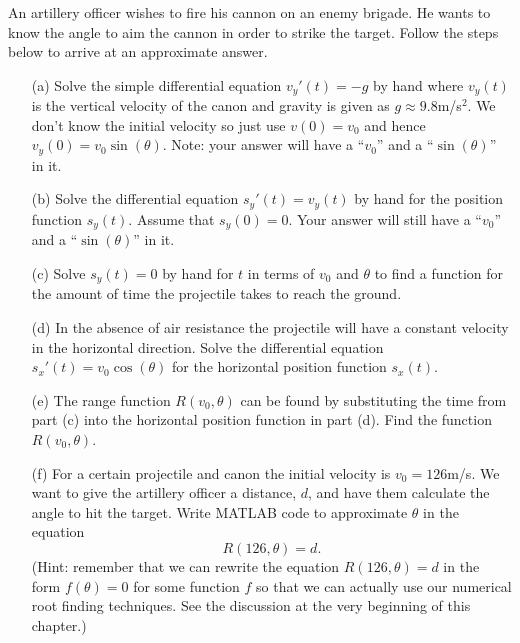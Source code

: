 \begin{problem}
    An artillery officer wishes to fire his cannon on an enemy brigade.  He wants to know
    the angle to aim the cannon in order to strike the target.  Follow the steps below to
    arrive at an approximate answer.
    \begin{enumerate}
        \item[(a)] Solve the simple differential equation $v_y'(t) = -g$ by hand where $v_y(t)$
            is the vertical velocity of the canon and gravity is given as $g \approx
            9.8$m/s$^2$.  We don't know the initial velocity so just use $v(0) = v_0$ and
            hence $v_y(0) = v_0 \sin(\theta)$. Note: your answer will have a ``$v_0$'' and a
            ``$\sin(\theta)$'' in it.
        \item[(b)] Solve the differential equation $s_y'(t) = v_y(t)$ by hand for the position
            function $s_y(t)$.  Assume that $s_y(0) = 0$.  Your answer will still have a ``$v_0$'' and a
            ``$\sin(\theta)$'' in it.
        \item[(c)] Solve $s_y(t) = 0$ by hand for $t$ in terms of $v_0$ and $\theta$ to
            find a function for the amount of time the projectile takes to reach the
            ground.
        \item[(d)] In the absence of air resistance the projectile will have a constant
            velocity in the horizontal direction.  Solve the differential equation
            $s_x'(t) = v_0 \cos(\theta)$ for the horizontal position function $s_x(t)$.  
        \item[(e)] The range function $R(v_0,\theta)$ can be found by substituting the
            time from part (c) into the horizontal position function in part (d).  Find
            the function $R(v_0,\theta)$.
        \item[(f)] For a certain projectile and canon the initial velocity is $v_0 =
            126$m/s.  We want to give the artillery officer a distance, $d$, and have them
            calculate the angle to hit the target.  Write MATLAB code to approximate
            $\theta$ in the equation 
            \[ R(126,\theta) = d. \]
            (Hint: remember that we can rewrite the equation $R(126,\theta)=d$ in the form
            $f(\theta) = 0$ for some function $f$ so that we can actually use our
            numerical root finding techniques. See the discussion at the very beginning of
            this chapter.)


\end{enumerate}
\end{problem}
